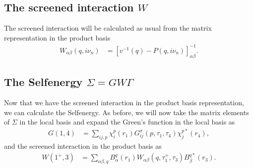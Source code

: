 \documentclass[12pt,a4paper]{scrartcl}
\numberwithin{equation}{section}
\begin{document}
\subsection{The screened interaction $W$}
The screened interaction will be calculated
as usual from the matrix representation in the product basis
\begin{align}
 W_{\alpha\beta}(q,i\nu_n)
 &= \left[ v^{-1}(q) - P(q,i\nu_n) \right]^{-1}_{\alpha\beta}.
\end{align}


\subsection{The Selfenergy $\Sigma=GW\Gamma$}

Now that we have the screened interaction in the product
basis representation, we can calculate the Selfenergy.
As before, we will now take the matrix elements of $\Sigma$ in the local
basis and expand the Green's function in the local basis as
\begin{align}
 G(1,4)  
 &= \sum_{ij,p} \chi^p_{i}(r_1) G^{\sigma}_{ij}(p,\tau_1,\tau_4) \chi^{p*}_{j}(r_4),
\end{align}
and the screened interaction in the product basis as
\begin{align}
 W(1^+,3)  
 &= \sum_{\alpha\beta, q} B^q_{\alpha}(r_1) W_{\alpha\beta}(q,\tau_1^+,\tau_3) 
     B^{q*}_{\beta}(r_3).
\end{align}
\end{document}
